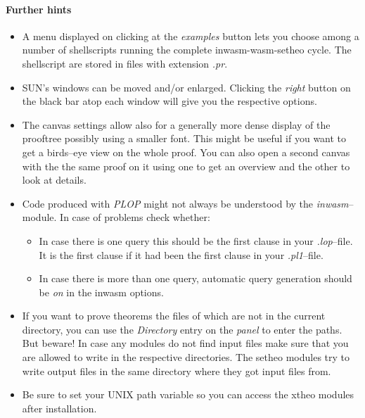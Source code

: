 \paragraph{Further hints}
\begin{itemize}
\item A menu displayed on clicking at the {\it examples\/} button lets you choose among a number of
shellscripts running the complete inwasm-wasm-setheo cycle. The shellscript are stored in files with
extension {\it .pr\/}. 
\item SUN's windows can be moved and/or enlarged. Clicking the {\it right\/} button on the black bar atop
each window will give you the respective options.
\item The canvas settings allow also for a generally more dense display of the prooftree possibly using a
smaller font. This might be useful if you want to get a birds--eye view on the whole proof.
You can also open a second canvas with the the same proof on it using one to get an overview and
the other to look at details.
\item Code produced with {\it PLOP\/} might not always be understood by the {\it inwasm\/}--module. In case of problems
check whether:
\begin{itemize}
\item In case there is one query this should be the first clause in your {\it .lop\/}--file. It is the first
clause if it had been the first clause in your {\it .pl1\/}--file.
\item In case there is more than one query, automatic query generation should be {\it on\/} in the
inwasm options.
\end{itemize}
\item If you want to prove theorems the files of which are not in the current directory,
you can use the {\it Directory\/} entry on the {\it panel\/} to enter the paths.
But beware!
In case any modules do not find input files make sure that you are allowed to write in the
respective directories. The setheo modules try to write output files in the same directory where
they got input files from. 
\item Be sure to set your UNIX path variable so you can access the xtheo modules after installation.
\end{itemize}
